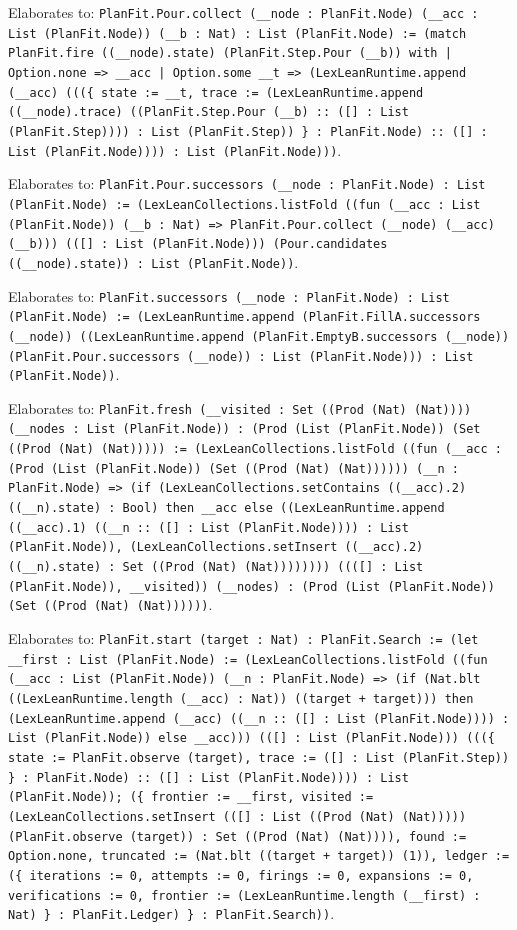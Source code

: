 \documentclass[11pt]{article}
\begin{document}
\noindent Elaborates to: \texttt{PlanFit.Pour.collect (\_\_node : PlanFit.Node) (\_\_acc : List (PlanFit.Node)) (\_\_b : Nat) : List (PlanFit.Node) := (match PlanFit.fire ((\_\_node).state) (PlanFit.Step.Pour (\_\_b)) with | Option.none => \_\_acc | Option.some \_\_t => (LexLeanRuntime.append (\_\_acc) (((\{ state := \_\_t, trace := (LexLeanRuntime.append ((\_\_node).trace) ((PlanFit.Step.Pour (\_\_b) :: ([] : List (PlanFit.Step)))) : List (PlanFit.Step)) \} : PlanFit.Node) :: ([] : List (PlanFit.Node)))) : List (PlanFit.Node)))}.\par
\noindent Elaborates to: \texttt{PlanFit.Pour.successors (\_\_node : PlanFit.Node) : List (PlanFit.Node) := (LexLeanCollections.listFold ((fun (\_\_acc : List (PlanFit.Node)) (\_\_b : Nat) => PlanFit.Pour.collect (\_\_node) (\_\_acc) (\_\_b))) (([] : List (PlanFit.Node))) (Pour.candidates ((\_\_node).state)) : List (PlanFit.Node))}.\par
\noindent Elaborates to: \texttt{PlanFit.successors (\_\_node : PlanFit.Node) : List (PlanFit.Node) := (LexLeanRuntime.append (PlanFit.FillA.successors (\_\_node)) ((LexLeanRuntime.append (PlanFit.EmptyB.successors (\_\_node)) (PlanFit.Pour.successors (\_\_node)) : List (PlanFit.Node))) : List (PlanFit.Node))}.\par
\noindent Elaborates to: \texttt{PlanFit.fresh (\_\_visited : Set ((Prod (Nat) (Nat)))) (\_\_nodes : List (PlanFit.Node)) : (Prod (List (PlanFit.Node)) (Set ((Prod (Nat) (Nat))))) := (LexLeanCollections.listFold ((fun (\_\_acc : (Prod (List (PlanFit.Node)) (Set ((Prod (Nat) (Nat)))))) (\_\_n : PlanFit.Node) => (if (LexLeanCollections.setContains ((\_\_acc).2) ((\_\_n).state) : Bool) then \_\_acc else ((LexLeanRuntime.append ((\_\_acc).1) ((\_\_n :: ([] : List (PlanFit.Node)))) : List (PlanFit.Node)), (LexLeanCollections.setInsert ((\_\_acc).2) ((\_\_n).state) : Set ((Prod (Nat) (Nat)))))))) ((([] : List (PlanFit.Node)), \_\_visited)) (\_\_nodes) : (Prod (List (PlanFit.Node)) (Set ((Prod (Nat) (Nat))))))}.\par
\noindent Elaborates to: \texttt{PlanFit.start (target : Nat) : PlanFit.Search := (let \_\_first : List (PlanFit.Node) := (LexLeanCollections.listFold ((fun (\_\_acc : List (PlanFit.Node)) (\_\_n : PlanFit.Node) => (if (Nat.blt ((LexLeanRuntime.length (\_\_acc) : Nat)) ((target + target))) then (LexLeanRuntime.append (\_\_acc) ((\_\_n :: ([] : List (PlanFit.Node)))) : List (PlanFit.Node)) else \_\_acc))) (([] : List (PlanFit.Node))) (((\{ state := PlanFit.observe (target), trace := ([] : List (PlanFit.Step)) \} : PlanFit.Node) :: ([] : List (PlanFit.Node)))) : List (PlanFit.Node)); (\{ frontier := \_\_first, visited := (LexLeanCollections.setInsert (([] : List ((Prod (Nat) (Nat))))) (PlanFit.observe (target)) : Set ((Prod (Nat) (Nat)))), found := Option.none, truncated := (Nat.blt ((target + target)) (1)), ledger := (\{ iterations := 0, attempts := 0, firings := 0, expansions := 0, verifications := 0, frontier := (LexLeanRuntime.length (\_\_first) : Nat) \} : PlanFit.Ledger) \} : PlanFit.Search))}.\par
\end{document}
